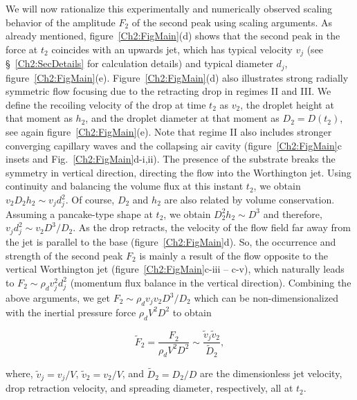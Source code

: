 We will now rationalize this experimentally and numerically observed scaling behavior of the amplitude $F_2$ of the second peak using scaling arguments. As already mentioned, figure~\ref{Ch2:FigMain}(d) shows that the second peak in the force at $t_2$ coincides with an upwards jet, which has typical velocity $v_j$ (see \S~\ref{Ch2:SecDetails} for calculation details) and typical diameter $d_j$, figure~\ref{Ch2:FigMain}(e). Figure~\ref{Ch2:FigMain}(d) also illustrates strong radially symmetric flow focusing due to the retracting drop in regimes II and III. We define the recoiling velocity of the drop at time $t_2$ as $v_2$, the droplet height at that moment as $h_2$, and the droplet diameter at that moment as $D_2 = D(t_2)$, see again figure~\ref{Ch2:FigMain}(e). Note that regime II also includes stronger converging capillary waves and the collapsing air cavity (figure~\ref{Ch2:FigMain}c insets and Fig.~\ref{Ch2:FigMain}d-i,ii). The presence of the substrate breaks the symmetry in vertical direction, directing the flow into the Worthington jet. Using continuity and balancing the volume flux at this instant $t_2$, we obtain $v_2  D_2 h_2 \sim v_jd_j^2$. Of course, $D_2$ and $h_2$ are also related by volume conservation. Assuming a pancake-type shape at $t_2$, we obtain $D_2^2h_2 \sim D^3$ \cite{wildeman2016spreading} and therefore, $v_jd_j^2 \sim v_2 D^3/D_2$. As the drop retracts, the velocity of the flow field far away from the jet is parallel to the base (figure~\ref{Ch2:FigMain}d). So, the occurrence and strength of the second peak $F_2$ is mainly a result of the flow opposite to the vertical Worthington jet (figure~\ref{Ch2:FigMain}c-iii -- c-v), which naturally leads to $F_2 \sim \rho_d v_j^2d_j^2$ (momentum flux balance in the vertical direction). Combining the above arguments, we get $F_2 \sim \rho_d v_jv_2 D^3/D_2$ which can be non-dimensionalized with the inertial pressure force $\rho_d V^2D^2$ to obtain

\begin{equation}
	\tilde{F}_2 = \frac{F_2}{\rho_d V^2D^2} \sim \frac{\tilde{v}_j\tilde{v}_2}{\tilde D_2},
	\label{Ch2:EqnTheoryForce2}
\end{equation}

\noindent where, $\tilde{v}_j = v_j/V$, $\tilde{v}_2 = v_2/V$, and $\tilde D_2 = D_2/D$ are the dimensionless jet velocity, drop retraction velocity, and spreading diameter, respectively, all at $t_2$.  

